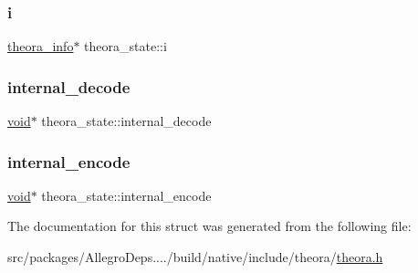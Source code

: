\mbox{\label{structtheora__state_a0efc7ac581ef260b0ca17f518ace0731}} 
\subsubsection{\texorpdfstring{i}{i}}
{\footnotesize\ttfamily \hyperlink{structtheora__info}{theora\+\_\+info}$\ast$ theora\+\_\+state\+::i}

\mbox{\label{structtheora__state_ad20c4eebbc5ed9764cf03ba8b90e796e}} 
\subsubsection{\texorpdfstring{internal\+\_\+decode}{internal\_decode}}
{\footnotesize\ttfamily \hyperlink{png_8h_ac9c84fa68bbad002983e35ce3663c686}{void}$\ast$ theora\+\_\+state\+::internal\+\_\+decode}

\mbox{\label{structtheora__state_a1fbfd82fb7210cbcc4233cb680ec2af6}} 
\subsubsection{\texorpdfstring{internal\+\_\+encode}{internal\_encode}}
{\footnotesize\ttfamily \hyperlink{png_8h_ac9c84fa68bbad002983e35ce3663c686}{void}$\ast$ theora\+\_\+state\+::internal\+\_\+encode}



The documentation for this struct was generated from the following file\+:\begin{DoxyCompactItemize}
\item 
src/packages/\+Allegro\+Deps..../build/native/include/theora/\hyperlink{theora_8h}{theora.\+h}\end{DoxyCompactItemize}
